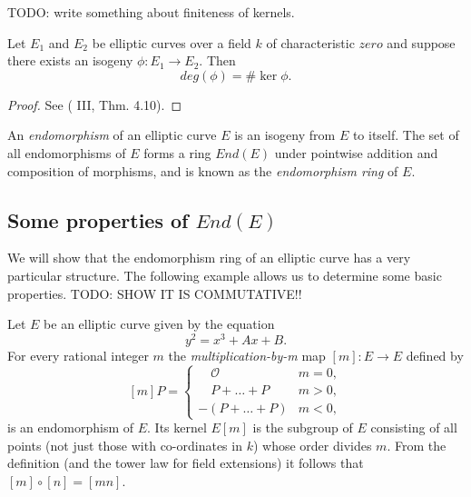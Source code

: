 TODO: write something about finiteness of kernels.

\begin{prop}
  \label{prop:deg-phi-equals-sizeof-kernel}
  Let $E_{1}$ and $E_{2}$ be elliptic curves over a field $k$ of characteristic
  $zero$ and suppose there exists an isogeny $\phi : E_{1} \rightarrow E_{2}$.  Then
  \begin{equation*}
    deg(\phi) = \# \ker{\phi}.
  \end{equation*}
\end{prop}
\begin{proof}
  See (\cite{silverman86} III, Thm. 4.10).
\end{proof}

An \emph{endomorphism} of an elliptic curve $E$ is an isogeny from $E$ to itself.
The set of all endomorphisms of $E$ forms a ring $End(E)$ under pointwise addition
and composition of morphisms, and is known as the \emph{endomorphism ring} of $E$.

\subsection{Some properties of $End(E)$}
\label{sec:some-properties-ende}

We will show that the endomorphism ring of an elliptic curve has a very particular
structure.  The following example allows us to determine some basic properties.
TODO: SHOW IT IS COMMUTATIVE!!

\begin{example}
  \label{ex:mult-by-m}
  Let $E$ be an elliptic curve given by the equation
  \begin{equation*}
    y^{2} = x^{3} + Ax + B.
  \end{equation*}
  For every rational integer $m$ the
  \emph{multiplication-by-m} map $\left[m\right] \colon E \rightarrow E$ defined by
  \begin{equation*}
    \left[ m \right] P =
    \begin{cases}
      \quad \mathcal{O} & m = 0,\\
      \quad P + \ldots + P & m > 0,\\
      - \left( P + \ldots + P \right) & m < 0,
    \end{cases}
  \end{equation*}
  is an endomorphism of $E$.  Its kernel $E[m]$ is the subgroup of $E$ consisting of
  all points (not just those with co-ordinates in $k$) whose order divides $m$.  From the definition (and the tower law for field extensions) it
  follows that $\left[m\right] \circ \left[n\right] = \left[mn\right]$.
\end{example}

